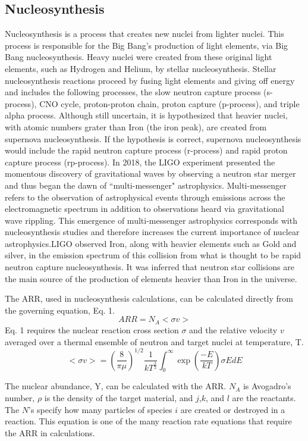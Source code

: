 \documentclass{article}
\begin{document}
\subsection{Nucleosynthesis}
Nucleosynthesis is a process that creates new nuclei from lighter nuclei. This process is responsible for the Big Bang’s production of light elements, via Big Bang nucleosynthesis. Heavy nuclei were created from these original light elements, such as Hydrogen and Helium, by stellar nucleosynthesis.  Stellar nucleosynthesis reactions proceed by fusing light elements and giving off energy and includes the following processes, the slow neutron capture process (s-process), CNO cycle, proton-proton chain, proton capture (p-process), and triple alpha process. Although still uncertain, it is hypothesized that heavier nuclei, with atomic numbers grater than Iron (the iron peak), are created from supernova nucleosynthesis. If the hypothesis is correct, supernova nucleosynthesis would include the rapid neutron capture process (r-process) and rapid proton capture process (rp-process).\cite{rprocess} In 2018, the LIGO experiment presented the momentous discovery of gravitational waves by observing a neutron star merger and thus began the dawn of ``multi-messenger" astrophysics. Multi-messenger refers to the observation of astrophysical events through emissions across the electromagnetic spectrum in addition to observations heard via gravitational wave rippling. This emergence of multi-messenger astrophysics corresponds with nucleosynthesis studies and therefore increases the current importance of nuclear astrophysics.LIGO observed Iron, along with heavier elements such as Gold and silver, in the emission spectrum of this collision from what is thought to be rapid neutron capture nucleosynthesis. It was inferred that neutron star collisions are the main source of the production of elements heavier than Iron in the universe. \cite{ligo}  \par
The ARR, used in nucleosynthesis calculations, can be calculated directly from the governing equation, Eq. 1. \cite{cosmo}  
\begin{equation}
 ARR = N_A <\sigma v> \label{eq:2}
\end{equation}
 Eq. 1 requires the nuclear reaction cross section $\sigma$ and the relative velocity $v$ averaged over a thermal ensemble of neutron and target nuclei at temperature, T. 
 \begin{equation}
 <\sigma v> = (\frac{8}{\pi \mu})^{1/2} \frac{1}{kT^\frac{3}{2}} \int_{0}^{\infty}   \exp(\frac{-E}{kT}) \sigma E dE \label{eq:3}
\end{equation}
  \par
The nuclear abundance, Y, can be calculated with the ARR. $N_A$ is Avogadro's number, $\rho$ is the density of the target material, and $j$,$k$, and $l$ are the reactants. The $N$'s specify how many particles of species $i$ are created or destroyed in a reaction. This equation is one of the many reaction rate equations that require the ARR in calculations. \cite{parameter} \par
\end{document}
